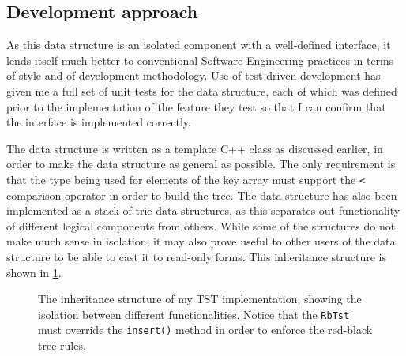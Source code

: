 \documentclass[a4paper,12pt,twoside,openright]{report}
\begin{document}
	\subsection{Development approach}
	
	As this data structure is an isolated component with a well-defined interface, it lends itself much better to conventional Software Engineering practices in terms of style and of development methodology. Use of test-driven development has given me a full set of unit tests for the data structure, each of which was defined prior to the implementation of the feature they test so that I can confirm that the interface is implemented correctly.
	
	The data structure is written as a template C++ class as discussed earlier, in order to make the data structure as general as possible. The only requirement is that the type being used for elements of the key array must support the \verb|<| comparison operator in order to build the tree. The data structure has also been implemented as a stack of trie data structures, as this separates out functionality of different logical components from others. While some of the structures do not make much sense in isolation, it may also prove useful to other users of the data structure to be able to cast it to read-only forms. This inheritance structure is shown in \figurename{ \ref{fig:RbtTrie-inheritance}}.
	
	\begin{figure}
		\centering
		\caption{The inheritance structure of my TST implementation, showing the isolation between different functionalities. Notice that the \texttt{RbTst} must override the \texttt{insert()} method in order to enforce the red-black tree rules.}
		\label{fig:RbtTrie-inheritance}
	\end{figure}
	
\end{document}

